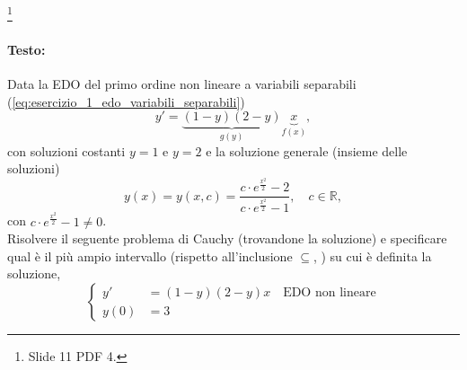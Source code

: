 \begin{example}\footnote{Slide 11 PDF 4.}
    \paragraph{Testo:} Data la EDO del primo ordine non lineare a variabili separabili (\ref{eq:esercizio_1_edo_variabili_separabili})
    \begin{equation*}
        y' = \underbrace{(1-y)(2-y)}_{g(y)}\underbrace{x}_{f(x)},
    \end{equation*}
    con soluzioni costanti $y=1$ e $y=2$ e la soluzione generale (insieme delle soluzioni)
    \begin{equation}\label{eq:esercizio_1_intergrale_generale_problema_cauchy}
        y(x) = y(x,c)=\frac{c\cdot e^{\frac{x^2}{2}}-2}{c\cdot e^{\frac{x^2}{2}}-1},\quad c\in\mathbb R,
    \end{equation}
    con $c\cdot e^{\frac{x^2}{2}}-1\neq 0$.\\
    Risolvere il seguente problema di Cauchy (trovandone la soluzione) e specificare qual è il più ampio intervallo (rispetto all'inclusione $\subseteq$, \footnotemark) su cui è definita la soluzione,
    \begin{equation*}
        \begin{cases}
            y'&=(1-y)(2-y)x\quad\text{EDO non lineare}\\
            y(0) &= 3
        \end{cases}
    \end{equation*}
    

\end{example}
